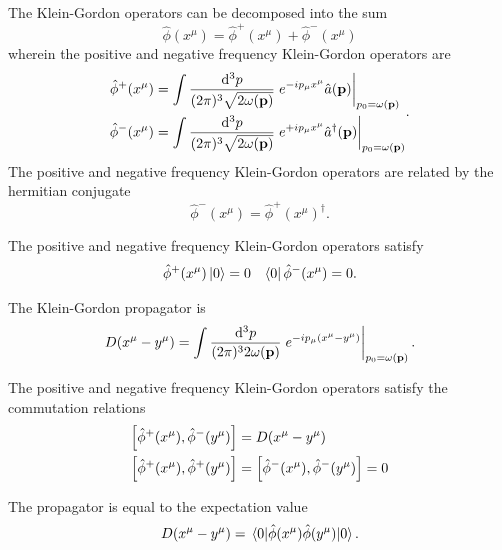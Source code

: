 \begin{definition}
	The Klein-Gordon operators can be decomposed into the sum
	\begin{equation}
		\hat\phi(x^\mu)
		=
		\hat\phi^+(x^\mu)
		+
		\hat\phi^-(x^\mu)
	\end{equation}
	wherein the positive and negative frequency Klein-Gordon operators are
	\begin{equation}
		\begin{split}
			\hat\phi^+(x^\mu)
			&=
			\int\frac{\dd[3]{p}}{(2\pi)^3\sqrt{2\omega(\vb{p})}}
			\eval{
				e^{-ip_\mu x^\mu}
				\hat{a}(\vb{p})
			}_{p_0=\omega(\vb{p})}
			\\
			\hat\phi^-(x^\mu)
			&=
			\int\frac{\dd[3]{p}}{(2\pi)^3\sqrt{2\omega(\vb{p})}}
			\eval{
				e^{+ip_\mu x^\mu}
				\hat{a}^\dagger(\vb{p})
			}_{p_0=\omega(\vb{p})}
		\end{split}
		\label{eq:qkg_positive_negative_frequency}
		.
	\end{equation}
	The positive and negative frequency Klein-Gordon operators are related by the hermitian conjugate
	\begin{equation}
		\hat\phi^-(x^\mu)
		=
		\hat\phi^+(x^\mu)^\dagger
		.
	\end{equation}
\end{definition}
\begin{corollary}
	The positive and negative frequency Klein-Gordon operators satisfy
	\begin{align}
		\hat\phi^+(x^\mu)
		\ket{0}
		=
		0
		&&
		\bra{0}
		\hat\phi^-(x^\mu)
		=
		0
		.
	\end{align}
\end{corollary}
\begin{definition}
	The Klein-Gordon propagator is
	\begin{equation}
		D(x^\mu-y^\mu)
		=
		\int\frac{\dd[3]{p}}{(2\pi)^32\omega(\vb{p})}
		\eval{
			e^{-ip_\mu (x^\mu-y^\mu)}
		}_{p_0=\omega(\vb{p})}
		.
	\end{equation}
\end{definition}
\begin{lemma}\label{thm:qkg_pn_comm}
	The positive and negative frequency Klein-Gordon operators satisfy the commutation relations
	\begin{align}
		\comm{\hat\phi^+(x^\mu)}{\hat\phi^-(y^\mu)}
		&=
		D(x^\mu-y^\mu)
		\\
		\comm{\hat\phi^+(x^\mu)}{\hat\phi^+(y^\mu)}
		&=
		\comm{\hat\phi^-(x^\mu)}{\hat\phi^-(y^\mu)}
		=
		0
	\end{align}
\end{lemma}
\begin{lemma}\label{thm:qkg_propagator_correlation_function}
	The propagator is equal to the expectation value
	\begin{equation}
		D(x^\mu-y^\mu)
		=
		\expval{\hat\phi(x^\mu)\hat\phi(y^\mu)}{0}
		.
	\end{equation}
\end{lemma}